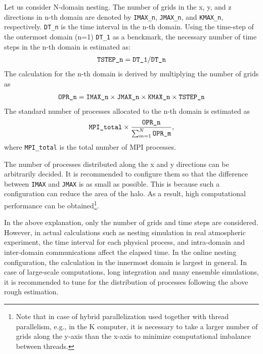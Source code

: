 Let us consider N-domain nesting. The number of grids in the x, y, and z directions in n-th domain are denoted by
\verb|IMAX_n|, \verb|JMAX_n|, and \verb|KMAX_n|, respectively.
\verb|DT_n| is the time interval  in the n-th domain.
Using the time-step of the outermost domain (n=1) \verb|DT_1| as a benckmark, 
the necessary number of time steps in the n-th domain is estimated as:
\begin{eqnarray}
 \verb|TSTEP_n| = \verb|DT_1| / \verb|DT_n|  \nonumber
\end{eqnarray}
The calculation for the n-th domain is derived by multiplying the number of grids as
\begin{eqnarray}
 \verb|OPR_n| = \verb|IMAX_n| \times \verb|JMAX_n| \times \verb|KMAX_n| \times \verb|TSTEP_n| \nonumber
\end{eqnarray}
The standard number of processes allocated to the n-th domain is estimated as
\begin{eqnarray}
 \verb|MPI_total| \times \frac{ \texttt{OPR\_n} }{ \sum_{m=1}^N \texttt{OPR\_m} },
\end{eqnarray}
where \verb|MPI_total| is the total number of MPI processes.

The number of processes distributed along the x and y directions  can be arbitrarily decided.
It is recommended to configure them so that the difference between \verb|IMAX| and \verb|JMAX| is as small as possible. This is because such a configuration can reduce the area of the halo. As a result, high computational performance can be obtained\footnote{Note that in case of hybrid parallelization used together with thread parallelism,  e.g., in the K computer, it is necessary to take a larger number of grids along the y-axis than the x-axis to minimize computational imbalance between threads.}. 


In the above explanation, only the number of grids and time steps are considered. However, in actual calculations such as nesting simulation in real atmospheric experiment, the time interval for each physical process, and intra-domain and inter-domain communications affect the elapsed time. In the online nesting configuration, the calculation in the innermost domain is largest in general.  In case of large-scale computations, long integration and many ensemble simulations, it is recommended to tune for the distribution of processes following the above rough estimation.

